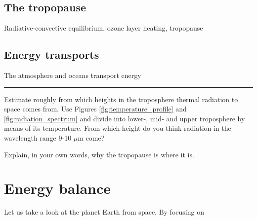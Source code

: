 \documentclass[12pt]{book}
\begin{document}
\section{The tropopause}

Radiative-convective equilibrium, ozone layer heating, tropopause

\section{Energy transports}
The atmosphere and oceans transport energy

\vspace{1 cm}
\hrule
{\setlength{\parindent}{0cm}
\begin{exercise}
Estimate roughly from which heights in the troposphere thermal radiation to space comes from. Use Figures \ref{fig:temperature_profile} and \ref{fig:radiation_spectrum} and divide into lower-, mid- and upper troposphere by means of its temperature. From which height do you think radiation in the wavelength range 9-10 $\mu$m come?
\end{exercise}

\begin{exercise}
Explain, in your own words, why the tropopause is where it is.
\end{exercise}
}

%
%
%
% 
%


\chapter{Energy balance}
Let us take a look at the planet Earth from space. By focusing on 
\end{document}
